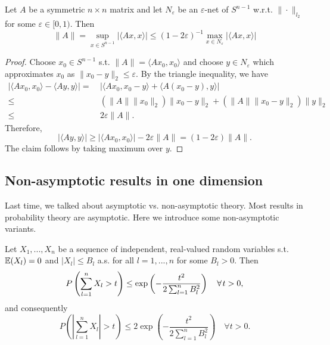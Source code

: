 \begin{lemma}
\begin{mdframed}
Let $A$ be a symmetric $n\times n$ matrix and let $N_\varepsilon$ be an $\varepsilon$-net of $S^{n-1}$ w.r.t. $\|\cdot \|_{l_2}$  for some $\varepsilon \in [0,1)$. Then
\begin{equation*}
\|A\| = \sup_{x \in S^{n-1}} |\langle Ax, x \rangle | \leq (1-2\varepsilon)^{-1} \max_{x\in N_\varepsilon} |\langle Ax,x \rangle|
\end{equation*}
\end{mdframed}
\begin{proof}
Choose $x_0 \in S^{n-1}$ s.t. $\|A\|= \langle Ax_0,x_0\rangle$ and choose $y\in N_\varepsilon$ which approximates $x_0$ as $\|x_0 - y \|_2 \leq \varepsilon$. By the triangle inequality, we have
\begin{equation*}
\begin{split}
|\langle Ax_0,x_0 \rangle - \langle Ay,y \rangle| =\  & |\langle Ax_0, x_0-y\rangle + \langle A(x_0-y),y\rangle | \\
\leq  \ & (\|A\| \|x_0\|_2)\|x_0-y\|_2 + (\|A\| \|x_0-y\|_2)\|y\|_2 \\
\leq \ & 2\varepsilon \|A\|.
\end{split}
\end{equation*}
Therefore,
\begin{equation*}
|\langle Ay,y \rangle | \geq |\langle A x_0, x_0 \rangle | - 2 \varepsilon \|A\| = (1-2\varepsilon) \|A\|.
\end{equation*}
The claim follows by taking maximum over $y$.
\end{proof}
\end{lemma}
\subsection{Non-asymptotic results in one dimension}
Last time, we talked about asymptotic vs. non-asymptotic theory. Most results in probability theory are asymptotic. Here we introduce some non-asymptotic variants.
\begin{prop}
\begin{mdframed}
Let $X_1,...,X_n$ be a sequence of independent, real-valued random variables s.t. $\mathbb{E}(X_l) =0$ and $|X_l| \leq B_l$ a.s. for all $l=1,...,n$ for some $B_l >0$. Then  \vspace{-0.3pc}
\begin{equation*}
P\left( 
\sum_{l=1}^n X_l > t \right) \leq \exp \left( 
- \frac{t^2}{2\sum_{l=1}^n B_l^2}
\right) \quad \forall t>0, \vspace{-0.3pc}
\end{equation*}
and consequently \vspace{-0.3pc}
\begin{equation*}
P\left( \left|
\sum_{l=1}^n X_l \right| > t  \right) \leq  2\exp \left( 
- \frac{t^2}{2\sum_{l=1}^n B_l^2}
\right) \quad \forall t>0. 
\end{equation*} 
\end{mdframed}
\end{prop}


